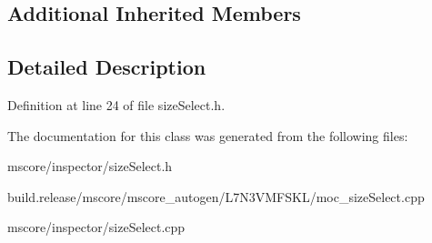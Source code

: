 \subsection*{Additional Inherited Members}


\subsection{Detailed Description}


Definition at line 24 of file size\+Select.\+h.



The documentation for this class was generated from the following files\+:\begin{DoxyCompactItemize}
\item 
mscore/inspector/size\+Select.\+h\item 
build.\+release/mscore/mscore\+\_\+autogen/\+L7\+N3\+V\+M\+F\+S\+K\+L/moc\+\_\+size\+Select.\+cpp\item 
mscore/inspector/size\+Select.\+cpp\end{DoxyCompactItemize}
